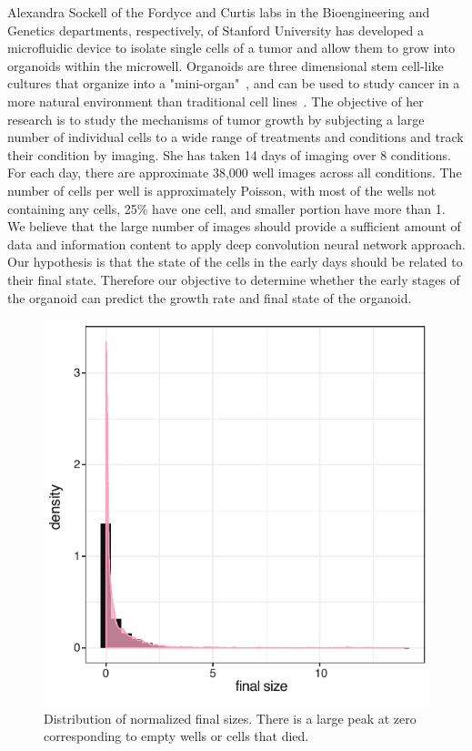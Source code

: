 \documentclass[10pt,twocolumn,letterpaper]{article}
\begin{document}
Alexandra Sockell of the Fordyce and Curtis labs in the Bioengineering and Genetics departments, respectively, of Stanford University has developed a microfluidic device to isolate single cells of a tumor and allow them to grow into organoids  within the microwell.  Organoids are three dimensional stem cell-like cultures that organize into a "mini-organ"~\cite{rios2018imaging}, and can be used to study cancer in a more natural environment than traditional cell lines~\cite{drost2018organoids}.
The objective of her research is to study the mechanisms of tumor growth by subjecting a large number of  individual cells to a wide range of treatments and conditions and track their condition by imaging.  She has taken 14 days of imaging over 8 conditions.    For each day, there are approximate 38,000 well images across all conditions.  The number of cells per well is approximately Poisson, with most of the wells not containing any cells, 25\% have one cell, and smaller portion have more than 1.  We believe that the large number of images should provide a sufficient amount of data and information content to apply deep convolution neural network approach.  Our hypothesis is that the state of the cells in the early days should be related to their final state.  Therefore our objective to determine whether the early stages of the organoid can predict the growth rate and final state of the organoid.    

\begin{figure}[b!]
\begin{center}
 \includegraphics[width=0.8\linewidth]{figures/final_day_hyst2_area_density.pdf}
\end{center}
   \caption{Distribution of normalized final sizes.  There is a large peak at zero corresponding to empty wells or cells that died.}
\label{final_size_dist}
\end{figure}
\end{document}
